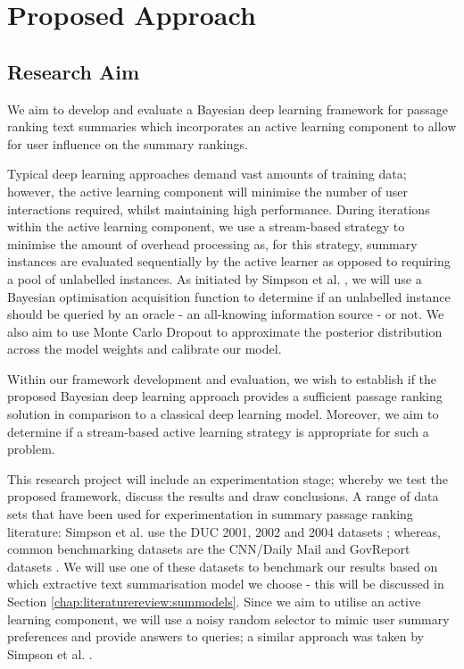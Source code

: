\section{Proposed Approach}
\label{chap:introduction:prop_approach}

\subsection{Research Aim}
\label{chap:introduction:prop_approach:aim}

We aim to develop and evaluate a Bayesian deep learning framework for passage ranking text summaries which incorporates an active learning component to allow for user influence on the summary rankings.
				
\medbreak
Typical deep learning approaches demand vast amounts of training data; however, the active learning component will minimise the number of user interactions required, whilst maintaining high performance. During iterations within the active learning component, we use a stream-based strategy to minimise the amount of overhead processing as, for this strategy, summary instances are evaluated sequentially by the active learner as opposed to requiring a pool of unlabelled instances. As initiated by Simpson et al. \cite{Simpson19}, we will use a Bayesian optimisation acquisition function to determine if an unlabelled instance should be queried by an oracle - an all-knowing information source - or not. We also aim to use Monte Carlo Dropout \cite{Gal15} to approximate the posterior distribution across the model weights and calibrate our model.

\medbreak
Within our framework development and evaluation, we wish to establish if the proposed Bayesian deep learning approach provides a sufficient passage ranking solution in comparison to a classical deep learning model. Moreover, we aim to determine if a stream-based active learning strategy is appropriate for such a problem.
				
\medbreak
This research project will include an experimentation stage; whereby we test the proposed framework, discuss the results and draw conclusions. A range of data sets that have been used for experimentation in summary passage ranking literature: Simpson et al. use the DUC 2001, 2002 and 2004 datasets \cite{Simpson19}; whereas, common benchmarking datasets are the CNN/Daily Mail and GovReport datasets \cite{Nallapati16, Huang21}. We will use one of these datasets to benchmark our results based on which extractive text summarisation model we choose - this will be discussed in Section \ref{chap:literaturereview:summodels}. Since we aim to utilise an active learning component, we will use a noisy random selector to mimic user summary preferences and provide answers to queries; a similar approach was taken by Simpson et al. \cite{Simpson19}.
				
